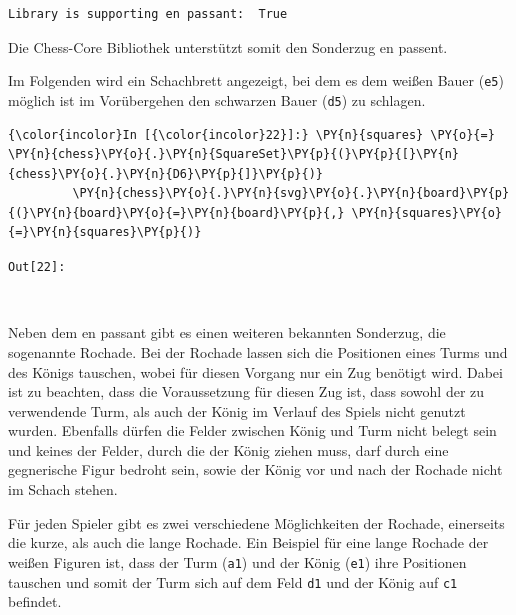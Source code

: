     \begin{Verbatim}[commandchars=\\\{\}]
Library is supporting en passant:  True

    \end{Verbatim}

    Die Chess-Core Bibliothek unterstützt somit den Sonderzug en passent.

Im Folgenden wird ein Schachbrett angezeigt, bei dem es dem weißen Bauer
(\texttt{e5}) möglich ist im Vorübergehen den schwarzen Bauer
(\texttt{d5}) zu schlagen.

    \begin{Verbatim}[commandchars=\\\{\}]
{\color{incolor}In [{\color{incolor}22}]:} \PY{n}{squares} \PY{o}{=} \PY{n}{chess}\PY{o}{.}\PY{n}{SquareSet}\PY{p}{(}\PY{p}{[}\PY{n}{chess}\PY{o}{.}\PY{n}{D6}\PY{p}{]}\PY{p}{)}
         \PY{n}{chess}\PY{o}{.}\PY{n}{svg}\PY{o}{.}\PY{n}{board}\PY{p}{(}\PY{n}{board}\PY{o}{=}\PY{n}{board}\PY{p}{,} \PY{n}{squares}\PY{o}{=}\PY{n}{squares}\PY{p}{)} 
\end{Verbatim}

\texttt{\color{outcolor}Out[{\color{outcolor}22}]:}
    
    \begin{center}
    \end{center}
    { \hspace*{\fill} \\}
    

    Neben dem en passant gibt es einen weiteren bekannten Sonderzug, die
sogenannte Rochade. Bei der Rochade lassen sich die Positionen eines
Turms und des Königs tauschen, wobei für diesen Vorgang nur ein Zug
benötigt wird. Dabei ist zu beachten, dass die Voraussetzung für diesen
Zug ist, dass sowohl der zu verwendende Turm, als auch der König im
Verlauf des Spiels nicht genutzt wurden. Ebenfalls dürfen die Felder
zwischen König und Turm nicht belegt sein und keines der Felder, durch
die der König ziehen muss, darf durch eine gegnerische Figur bedroht
sein, sowie der König vor und nach der Rochade nicht im Schach stehen.

Für jeden Spieler gibt es zwei verschiedene Möglichkeiten der Rochade,
einerseits die kurze, als auch die lange Rochade. Ein Beispiel für eine
lange Rochade der weißen Figuren ist, dass der Turm (\texttt{a1}) und
der König (\texttt{e1}) ihre Positionen tauschen und somit der Turm sich
auf dem Feld \texttt{d1} und der König auf \texttt{c1} befindet.

